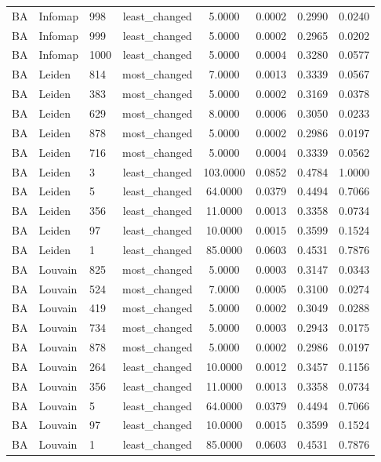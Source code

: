 \begin{longtable}{lllccccc}
BA & Infomap & 998 & least\_changed & 5.0000 & 0.0002 & 0.2990 & 0.0240 \\
BA & Infomap & 999 & least\_changed & 5.0000 & 0.0002 & 0.2965 & 0.0202 \\
BA & Infomap & 1000 & least\_changed & 5.0000 & 0.0004 & 0.3280 & 0.0577 \\
BA & Leiden & 814 & most\_changed & 7.0000 & 0.0013 & 0.3339 & 0.0567 \\
BA & Leiden & 383 & most\_changed & 5.0000 & 0.0002 & 0.3169 & 0.0378 \\
BA & Leiden & 629 & most\_changed & 8.0000 & 0.0006 & 0.3050 & 0.0233 \\
BA & Leiden & 878 & most\_changed & 5.0000 & 0.0002 & 0.2986 & 0.0197 \\
BA & Leiden & 716 & most\_changed & 5.0000 & 0.0004 & 0.3339 & 0.0562 \\
BA & Leiden & 3 & least\_changed & 103.0000 & 0.0852 & 0.4784 & 1.0000 \\
BA & Leiden & 5 & least\_changed & 64.0000 & 0.0379 & 0.4494 & 0.7066 \\
BA & Leiden & 356 & least\_changed & 11.0000 & 0.0013 & 0.3358 & 0.0734 \\
BA & Leiden & 97 & least\_changed & 10.0000 & 0.0015 & 0.3599 & 0.1524 \\
BA & Leiden & 1 & least\_changed & 85.0000 & 0.0603 & 0.4531 & 0.7876 \\
BA & Louvain & 825 & most\_changed & 5.0000 & 0.0003 & 0.3147 & 0.0343 \\
BA & Louvain & 524 & most\_changed & 7.0000 & 0.0005 & 0.3100 & 0.0274 \\
BA & Louvain & 419 & most\_changed & 5.0000 & 0.0002 & 0.3049 & 0.0288 \\
BA & Louvain & 734 & most\_changed & 5.0000 & 0.0003 & 0.2943 & 0.0175 \\
BA & Louvain & 878 & most\_changed & 5.0000 & 0.0002 & 0.2986 & 0.0197 \\
BA & Louvain & 264 & least\_changed & 10.0000 & 0.0012 & 0.3457 & 0.1156 \\
BA & Louvain & 356 & least\_changed & 11.0000 & 0.0013 & 0.3358 & 0.0734 \\
BA & Louvain & 5 & least\_changed & 64.0000 & 0.0379 & 0.4494 & 0.7066 \\
BA & Louvain & 97 & least\_changed & 10.0000 & 0.0015 & 0.3599 & 0.1524 \\
BA & Louvain & 1 & least\_changed & 85.0000 & 0.0603 & 0.4531 & 0.7876 \\

\end{longtable}
